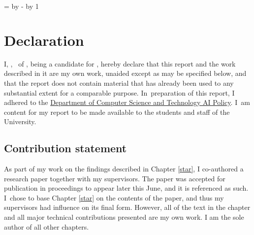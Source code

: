 \makeatletter
\@tempcnta=\relax%
\advance\@tempcnta by -%
\advance\@tempcnta by 1%
\xdef\contentpages{\the\@tempcnta}%
\makeatother

\begingroup
\onehalfspacing
\section*{Declaration}

I,
\makeatletter\ifanonymised
\candidate,
\else
\authorself{}\ of \college{},
\fi\makeatother
being a candidate for \coursefor{}, hereby declare that this report and
the work described in it are my own work, unaided except as may be
specified below, and that the report does not contain material that
has already been used to any substantial extent for a comparable
purpose.
In~preparation of this report, I adhered to the
\href{https://www.cst.cam.ac.uk/files/ai_policy.pdf}{Department of
Computer Science and Technology AI Policy}. I~am content for
my report to be made available to the students and staff of the
University.

\subsection*{Contribution statement}
As part of my work on the findings described in Chapter \ref{star}, I co-authored a research paper together with my supervisors. The paper was accepted for publication in proceedings to appear later this June, and it is referenced as such. I~chose to base Chapter \ref{star} on the contents of the paper, and thus my supervisors had influence on its final form. However, all of the text in the chapter and all major technical contributions presented are my own work.
I am the sole author of all other chapters.


